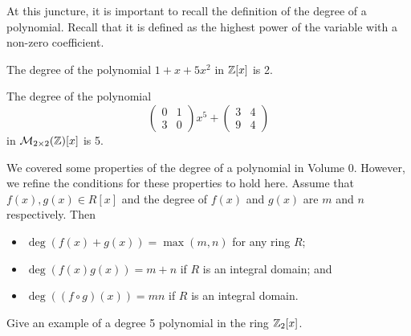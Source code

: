At this juncture, it is important to recall the definition of the degree of a polynomial. Recall that it is defined as the highest power of the variable with a non-zero coefficient.
\begin{example}
    The degree of the polynomial $1+x+5x^2$ in $\mathbb{Z}[x]$ is 2.
\end{example}
\begin{example}
    The degree of the polynomial
    \[
        \begin{pmatrix}0&1\\3&0\end{pmatrix}x^5 + \begin{pmatrix}3&4\\9&4\end{pmatrix}
    \]
    in $\mathcal{M}_{2\times2}(\mathbb{Z})[x]$ is 5.
\end{example}
We covered some properties of the degree of a polynomial in Volume 0. However, we refine the conditions for these properties to hold here. Assume that $f(x), g(x) \in R[x]$ and the degree of $f(x)$ and $g(x)$ are $m$ and $n$ respectively. Then
\begin{itemize}
    \item $\deg(f(x) + g(x)) = \max(m, n)$ for any ring $R$;
    \item $\deg(f(x)g(x)) = m+n$ if $R$ is an integral domain; and
    \item $\deg((f\circ g)(x)) = mn$ if $R$ is an integral domain.
\end{itemize}

\begin{exercise}
    Give an example of a degree 5 polynomial in the ring $\mathbb{Z}_{2}[x]$.
\end{exercise}

